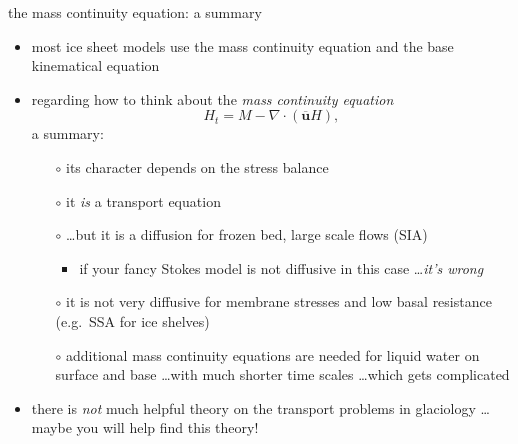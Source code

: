 \begin{frame}{the mass continuity equation: a summary}

\begin{itemize}
\item most ice sheet models use the mass continuity equation and the base kinematical equation

\bigskip
\item regarding how to think about the \emph{mass continuity equation}
  $$H_t = M - \nabla \cdot (\overline{\mathbf{u}} H),$$
a summary:
  \begin{itemize}
  \item[$\circ$] its character depends on the stress balance
  \item[$\circ$] it \emph{is} a transport equation
  \item[$\circ$] \dots but it is a diffusion for frozen bed, large scale flows (SIA)
      \begin{itemize}
      \item if your fancy Stokes model is not diffusive in this case \dots \emph{it's wrong}
      \end{itemize}
  \item[$\circ$] it is not very diffusive for membrane stresses and low basal resistance (e.g.~SSA for ice shelves)
  \item[$\circ$] additional mass continuity equations are needed for liquid water on surface and base \dots with much shorter time scales \dots which gets complicated
  \end{itemize}

\medskip
\item there is \emph{not} much helpful theory on the transport problems in glaciology \dots maybe you will help find this theory!
\end{itemize}
\end{frame}


